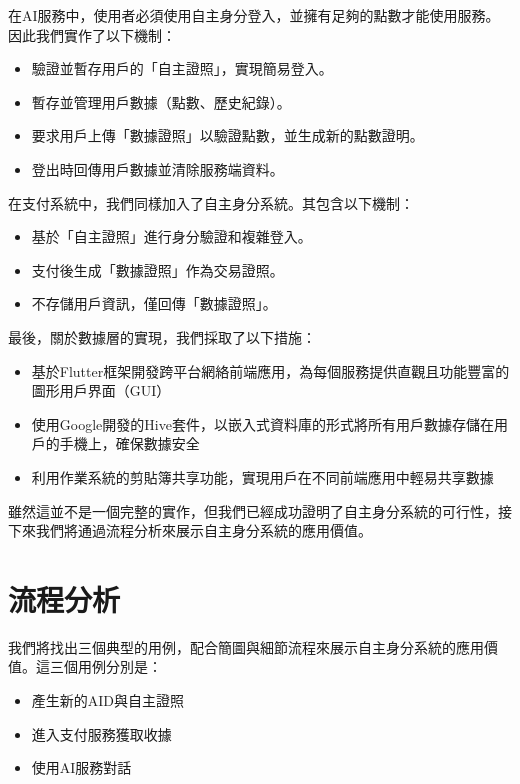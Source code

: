 在AI服務中，使用者必須使用自主身分登入，並擁有足夠的點數才能使用服務。因此我們實作了以下機制：
\begin{itemize}
  \item 驗證並暫存用戶的「自主證照」，實現簡易登入。
  \item 暫存並管理用戶數據（點數、歷史紀錄）。
  \item 要求用戶上傳「數據證照」以驗證點數，並生成新的點數證明。
  \item 登出時回傳用戶數據並清除服務端資料。
\end{itemize}
在支付系統中，我們同樣加入了自主身分系統。其包含以下機制：
\begin{itemize}
  \item 基於「自主證照」進行身分驗證和複雜登入。
  \item 支付後生成「數據證照」作為交易證照。
  \item 不存儲用戶資訊，僅回傳「數據證照」。
\end{itemize}
最後，關於數據層的實現，我們採取了以下措施：
\begin{itemize}
  \item 基於Flutter框架開發跨平台網絡前端應用，為每個服務提供直觀且功能豐富的圖形用戶界面（GUI）
  \item 使用Google開發的Hive套件，以嵌入式資料庫的形式將所有用戶數據存儲在用戶的手機上，確保數據安全
  \item 利用作業系統的剪貼簿共享功能，實現用戶在不同前端應用中輕易共享數據
\end{itemize}
雖然這並不是一個完整的實作，但我們已經成功證明了自主身分系統的可行性，接下來我們將通過流程分析來展示自主身分系統的應用價值。
\section{流程分析}
我們將找出三個典型的用例，配合簡圖與細節流程來展示自主身分系統的應用價值。這三個用例分別是：
\begin{itemize}
  \item 產生新的AID與自主證照
  \item 進入支付服務獲取收據
  \item 使用AI服務對話
\end{itemize}
